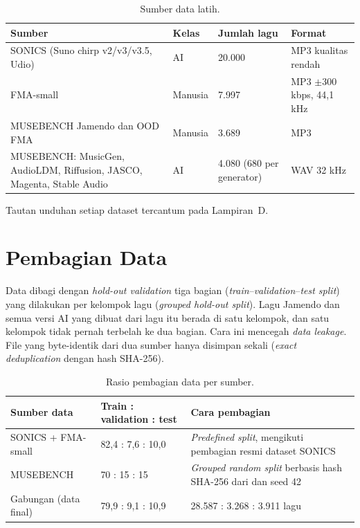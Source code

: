 \begin{table}[htbp]
\centering
\singlespacing\small
\caption{Sumber data latih.}
\label{tab:sumber-data}
\begin{tabularx}{\textwidth}{Y L{1.6cm} L{2.4cm} L{3.4cm}}
\toprule
Sumber & Kelas & Jumlah lagu & Format\\
\midrule
SONICS (Suno chirp v2/v3/v3.5, Udio) \cite{rahman2025sonics} & AI & 20.000 & MP3 kualitas rendah\\
FMA-small \cite{defferrard2017fma} & Manusia & 7.997 & MP3 $\pm$300 kbps, 44,1 kHz\\
MUSEBENCH Jamendo dan OOD FMA \cite{musebench} & Manusia & 3.689 & MP3\\
MUSEBENCH: MusicGen, AudioLDM, Riffusion, JASCO, Magenta, Stable Audio \cite{musebench} & AI & 4.080 (680 per generator) & WAV 32 kHz\\
\bottomrule
\end{tabularx}
\end{table}

Tautan unduhan setiap dataset tercantum pada Lampiran~D.

\section{Pembagian Data}\label{sec:split}
Data dibagi dengan \textit{hold-out validation} tiga bagian (\textit{train}--\textit{validation}--\textit{test split}) yang dilakukan per kelompok lagu (\textit{grouped hold-out split}). Lagu Jamendo dan semua versi AI yang dibuat dari lagu itu berada di satu kelompok, dan satu kelompok tidak pernah terbelah ke dua bagian. Cara ini mencegah \textit{data leakage}. File yang byte-identik dari dua sumber hanya disimpan sekali (\textit{exact deduplication} dengan hash SHA-256).

\begin{table}[htbp]
\centering
\singlespacing\small
\caption{Rasio pembagian data per sumber.}
\label{tab:rasio}
\begin{tabularx}{\textwidth}{L{3.6cm} L{3.4cm} Y}
\toprule
Sumber data & Train : validation : test & Cara pembagian\\
\midrule
SONICS + FMA-small & 82,4 : 7,6 : 10,0 & \textit{Predefined split}, mengikuti pembagian resmi dataset SONICS\\
MUSEBENCH & 70 : 15 : 15 & \textit{Grouped random split} berbasis hash SHA-256 dari  dan seed 42\\
Gabungan (data final) & 79,9 : 9,1 : 10,9 & 28.587 : 3.268 : 3.911 lagu\\
\bottomrule
\end{tabularx}
\end{table}

